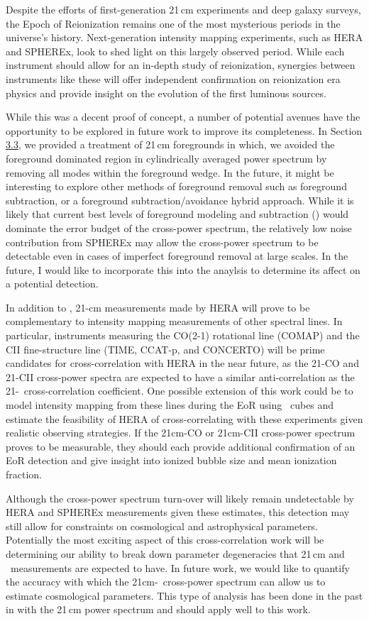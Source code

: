 Despite the efforts of first-generation 21\,cm experiments and deep galaxy surveys, the Epoch of Reionization
remains one of the most mysterious periods in the universe's history. Next-generation
intensity mapping experiments, such as HERA and SPHEREx, look to shed light on
this largely observed period. While each instrument should allow for an in-depth study
of reionization, synergies between instruments like these will offer independent
confirmation on reionization era physics and provide insight on the evolution of
the first luminous sources.

While this was a decent proof of concept, a number of potential avenues have the
opportunity to be explored in future work to improve its completeness. In Section \hyperref[sec:foregrounds]{3.3}, we provided a treatment
of 21\,cm foregrounds in which, we avoided the foreground dominated region in
cylindrically averaged power spectrum by removing all modes within the foreground
wedge. In the future, it might be interesting to explore other methods of foreground
removal such as foreground subtraction, or a foreground subtraction/avoidance hybrid approach.
While it is likely that current best levels of foreground modeling and subtraction
(\cite{2019ApJ...884....1B}) would dominate the error
budget of the cross-power spectrum, the relatively low noise contribution from SPHEREx
may allow the cross-power spectrum to be detectable even in cases of imperfect foreground
removal at large scales. In the future, I would like to incorporate this into the
anaylsis to determine its affect on a potential detection.

In addition to \lya, 21-cm measurements made by HERA will prove to be
complementary to intensity mapping measurements of other spectral lines. In particular,
instruments measuring the CO(2-1) rotational line (COMAP) and the CII fine-structure
line (TIME, CCAT-p, and CONCERTO) will be prime candidates for cross-correlation
with HERA in the near future, as the 21-CO and 21-CII cross-power spectra are expected to
have a similar anti-correlation as the 21-\lya\ cross-correlation coefficient. One possible extension of this work could be to model
intensity mapping from these lines during the EoR using \fastsim\ cubes and estimate the feasibility of HERA
of cross-correlating with these experiments given realistic observing strategies. If the 21cm-CO or 21cm-CII cross-power
spectrum proves to be measurable, they should each provide additional confirmation
of an EoR detection and give insight into ionized bubble size and mean ionization fraction.

Although the cross-power spectrum turn-over will likely remain undetectable
by HERA and SPHEREx measurements given these estimates, this
detection may still allow for constraints on cosmological and astrophysical parameters.
Potentially the most exciting aspect of this cross-correlation work will
be determining our ability to break down parameter degeneracies that
21\,cm and \lya\ measurements are expected to have. In future work, we would like to quantify
the accuracy with which the 21cm-\lya\ cross-power spectrum can allow us to estimate
cosmological parameters. This type of analysis has been done in the past in \cite{2014ApJ...782...66P}
with the 21\,cm power spectrum and should apply well to this work.
